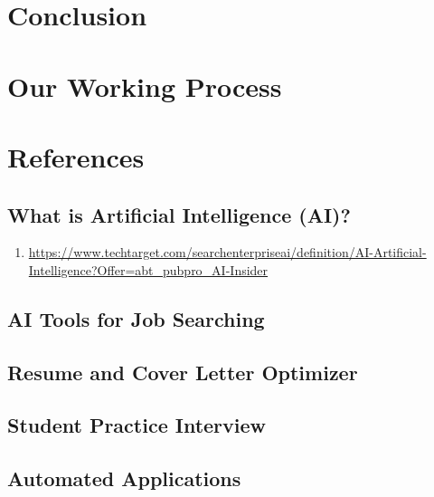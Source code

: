 \documentclass[
]{book}
\providecommand{\tightlist}{%
  \setlength{\itemsep}{0pt}\setlength{\parskip}{0pt}}
\begin{document}
\hypertarget{conclusion}{%
\chapter{Conclusion}\label{conclusion}}

\hypertarget{our-working-process}{%
\chapter{Our Working Process}\label{our-working-process}}

\hypertarget{references}{%
\chapter{References}\label{references}}

\hypertarget{what-is-artificial-intelligence-ai-1}{%
\section{What is Artificial Intelligence (AI)?}\label{what-is-artificial-intelligence-ai-1}}

\begin{enumerate}
\def\labelenumi{(\arabic{enumi})}
\tightlist
\item
  \url{https://www.techtarget.com/searchenterpriseai/definition/AI-Artificial-Intelligence?Offer=abt_pubpro_AI-Insider}
\end{enumerate}

\hypertarget{ai-tools-for-job-searching-1}{%
\section{AI Tools for Job Searching}\label{ai-tools-for-job-searching-1}}

\hypertarget{resume-and-cover-letter-optimizer}{%
\section{Resume and Cover Letter Optimizer}\label{resume-and-cover-letter-optimizer}}

\hypertarget{student-practice-interview}{%
\section{Student Practice Interview}\label{student-practice-interview}}

\hypertarget{automated-applications-1}{%
\section{Automated Applications}\label{automated-applications-1}}
\end{document}
